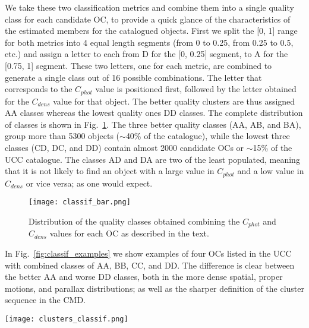 \documentclass[fleqn,usenatbib]{mnras}
\begin{document}
We take these two classification metrics and combine them into a single quality
class for each candidate OC, to provide a quick glance of the characteristics of
the estimated members for the catalogued objects.
First we split the [0, 1] range for both metrics into 4 equal length segments 
(from 0 to 0.25, from 0.25 to 0.5, etc.) and assign a letter to each from D for
the [0, 0.25] segment, to A for the [0.75, 1] segment.
These two letters, one for each metric, are combined to generate a single class
out of 16 possible combinations. The letter that corresponds to the $C_{phot}$ 
value is positioned first, followed by the letter obtained for the $C_{dens}$
value for that object. The better quality clusters are thus assigned AA classes
whereas the lowest quality ones DD classes.
The complete distribution of classes is shown in Fig.~\ref{fig:classif_bar}.
The three better quality classes (AA, AB, and BA), group more than 5300
objects ($\sim$40\% of the catalogue), while the lowest three classes (CD,
DC, and DD) contain almost 2000 candidate OCs or $\sim$15\% of the UCC
catalogue. The classes AD and DA are two of the least populated, meaning that it
is not likely to find an object with a large value in $C_{phot}$ and a low value
in $C_{dens}$ or vice versa; as one would expect.

\begin{figure}
	\texttt{[image: classif\_bar.png]}
    \caption{Distribution of the quality classes obtained combining the
    $C_{phot}$ and $C_{dens}$ values for each OC as described in the text.}
    \label{fig:classif_bar}
\end{figure}

In Fig.~\ref{fig:classif_examples} we show examples of four OCs listed in the
UCC with combined classes of AA, BB, CC, and DD. The difference is clear between
the better AA and worse DD classes, both in the more dense spatial, proper
motions, and parallax distributions; as well as the sharper definition of the
cluster sequence in the CMD.\\

\begin{figure*}
	\texttt{[image: clusters\_classif.png]}
    \caption{Examples of listed OCs with combined classes AA, BB, CC, and
    DD from top to bottom rows, respectively. Plots show from left to right:
    parallax distribution, spatial dispersion, proper motions, and CMD;
    respectively.
    Colourbars are associated to the membership probabilities assigned by 
    \texttt{fastMP}.}
    \label{fig:classif_examples}
\end{figure*}
\end{document}
